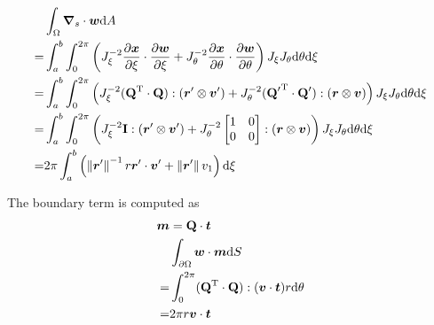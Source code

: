 \documentclass[a4paper,11pt]{article}
\renewcommand{\to}[1]{\text{\boldmath $#1$}} %
\newcommand{\ts}[1]{\text{\boldmath $\mathrm{#1}$}} %
\newcommand{\intd}[1]{\mathrm{d}#1}
\newcommand{\pderiv}[2]{\frac{\partial#1}{\partial#2}}
\newcommand{\norm}[1]{\left\lVert{#1}\right\rVert}
\newcommand{\T}{\mathrm{T}}
\begin{document}
\begin{align}
 &\int_\Omega\to \nabla_s\cdot\to w\intd A\\
=&\int_a^b\int_0^{2\pi}\left( J_\xi^{-2} \pderiv{\to x}{\xi}\cdot\pderiv{\to w}{\xi} +
                              J_\theta^{-2} \pderiv{\to x}{\theta}\cdot\pderiv{\to w}{\theta}
  \right) J_\xi J_\theta \intd \theta \intd \xi\\
=&\int_a^b\int_0^{2\pi}\left(
	  J_\xi^{-2} (\ts Q^\T\cdot\ts Q):(\to r'\otimes \to v') +
	  J_\theta^{-2} ({\ts Q'}^\T\cdot\ts Q'):(\to r\otimes\to v)
  \right) J_\xi J_\theta \intd \theta \intd \xi\\
=&\int_a^b\int_0^{2\pi}\left(
	  J_\xi^{-2} \ts I :(\to r'\otimes \to v') +
	  J_\theta^{-2} \begin{bmatrix}1&0\\0&0\end{bmatrix}:(\to r \otimes \to v)
  \right) J_\xi J_\theta \intd \theta \intd \xi\\
=&2\pi\int_a^b\left(
	  \norm{\to r'}^{-1} r \to r' \cdot \to v' +
	  \norm{\to r'} v_1
  \right) \intd \xi
\end{align}

The boundary term is computed as
\begin{align}
 \to m &= \ts Q\cdot \to t\\
 &\int_{\partial\Omega} \to w\cdot\to m\intd S\\
=&\int_0^{2\pi} (\ts Q^\T\cdot \ts Q):(\to v\cdot\to t) r \intd \theta\\
=& 2\pi r \to v \cdot \to t
\end{align}
\end{document}
